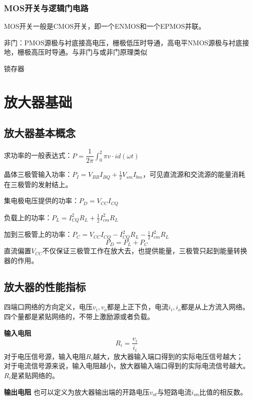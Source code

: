 \documentclass{ctexart}
\newcommand*{\noindbfquad}[1]{{\noindent \bf{#1} \qquad}}
\newcommand*{\noindbfline}[1]{{\noindent \bf{#1} \newline}}
\begin{document}
\subsubsection{MOS开关与逻辑门电路}
MOS开关一般是CMOS开关，即一个ENMOS和一个EPMOS并联。

非门：PMOS源极与衬底接高电压，栅极低压时导通，高电平NMOS源极与衬底接地，栅极高压时导通。与非门与或非门原理类似

锁存器
\section{放大器基础}
\subsection{放大器基本概念}
求功率的一般表达式：$P=\dfrac{1}{2\pi}\int _0^2\pi v\cdot i d(\omega t)$

晶体三极管输入功率：$P_I=V_{BB}I_{BQ}+\frac{1}{2}V_{sm}I_{bm}$，可见直流源和交流源的能量消耗在三极管的发射结上。

集电极电压提供的功率：$P_D=V_{CC}I_{CQ}$

负载上的功率：$P_L=I_{CQ}^2R_L+\frac{1}{2}I_{cm}^2R_L$

加到三极管上的功率：$P_C=V_{CC}I_{CQ}-I_{CQ}^2R_L-\frac{1}{2}I_{cm}^2R_L$
\begin{equation}
    P_D=P_L+P_C
\end{equation}
直流偏置$V_{CC}$不仅保证三极管工作在放大去，也提供能量，三极管只起到能量转换器的作用。
\subsection{放大器的性能指标}
四端口网络的方向定义，电压$v_i,v_o$都是上正下负，电流$i_i,i_o$都是从上方流入网络。四个量都是紧贴网络的，不带上激励源或者负载。

{\noindbfquad{输入电阻}}
\begin{equation}
    R_i=\dfrac{v_i}{i_i}
\end{equation}
对于电压信号源，输入电阻$R_i$越大，放大器输入端口得到的实际电压信号越大；对于电流信号源来说，输入电阻越小，放大器输入端口得到的实际电流信号越大。$R_i$是紧贴网络的。

\noindbfline{输出电阻}
{\color{red}{定义为：移开输出负载，在输出端加上电压$v$，除以因此产生的电流$i$，即$R_o=v/i$.注意，此时独立信号源置零但保留内阻。}}也可以定义为放大器输出端的开路电压$v_{ot}$与短路电流$i_{on}$比值的相反数。
\end{document}
